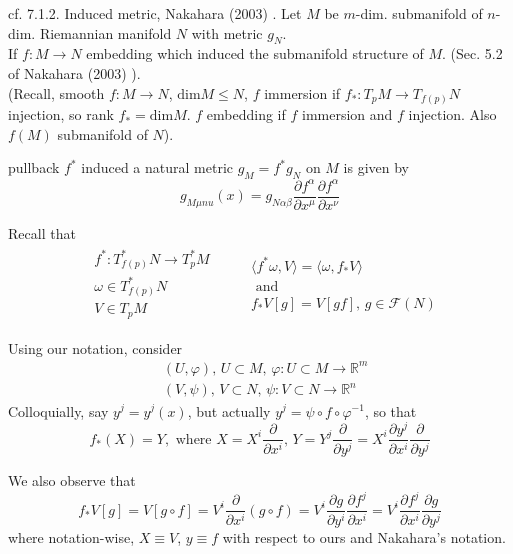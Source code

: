 cf. 7.1.2. Induced metric, Nakahara (2003) \cite{dgdt:Naka2003}. Let $M$ be $m$-dim. submanifold of $n$-dim. Riemannian manifold $N$ with metric $g_N$. \\
If $f:M \to N$ embedding which induced the submanifold structure of $M$. (Sec. 5.2 of Nakahara (2003) \cite{dgdt:Naka2003}). \\
(Recall, smooth $f: M \to N$, $\text{dim}M \leq N$, $f$ immersion if $f_* : T_pM \to T_{f(p)}N$ injection, so rank $f_* = \text{dim}M$. $f$ embedding if $f$ immersion and $f$ injection. Also $f(M)$ submanifold of $N$).

\begin{proposition}
pullback $f^*$ induced a natural metric $g_M = f^* g_N$ on $M$ is given by
\begin{equation}
	g_{M\mu nu} (x) = g_{N \alpha \beta} \frac{\partial f^{\alpha}}{\partial x^{\mu}}\frac{\partial f^{\alpha} }{ \partial x^{\nu}}
\end{equation}
\end{proposition}

Recall that
\[
\begin{gathered}
\begin{aligned}
	& f^* : T^*_{f(p)}N \to T_p^* M \\
	& \omega \in T^*_{f(p)}N \\
	& V \in T_p M
\end{aligned} \quad \quad \, 
\begin{gathered}
\langle f^* \omega, V \rangle = \langle \omega, f_* V \rangle \\
\text{ and } \\
f_*V[g] = V[gf], \, g\in \mathcal{F}(N)
\end{gathered}
\end{gathered}
\]

Using our notation, consider \\
\[
\begin{aligned}
	& (U, \varphi), \, U\subset M, \, \varphi : U \subset M \to \mathbb{R}^m \\
	& (V, \psi), \, V \subset N, \, \psi : V \subset N \to \mathbb{R}^n
\end{aligned}
\]
Colloquially, say $y^j = y^j(x)$, but actually $y^j = \psi \circ f\circ \varphi^{-1}$, so that
\[
f_*(X) = Y, \text{ where } X= X^i \frac{ \partial }{ \partial x^i }, \, Y = Y^j \frac{\partial }{ \partial y^j} = X^i \frac{ \partial y^j}{\partial x^i } \frac{ \partial }{ \partial y^j}
\]

We also observe that 
\[
f_* V[g] = V[g\circ f] = V^i \frac{ \partial }{ \partial x^i} (g\circ f) = V^i \frac{ \partial g}{ \partial y^i} \frac{ \partial f^j}{ \partial x^i } = V^i \frac{ \partial f^j}{ \partial x^i } \frac{ \partial g}{ \partial y^j}
\]
where notation-wise, $X\equiv V$, $y\equiv f$ with respect to ours and Nakahara's notation. \\

